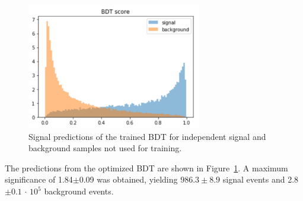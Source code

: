 \begin{figure}[!h]
\begin{center}
\includegraphics[width=3in]{BDT/bdt_pred}
\caption{Signal predictions of the trained BDT for independent signal and background samples not used for training.}
\label{fig:bdt_pred}
\end{center}
\end{figure}

The predictions from the optimized BDT are shown in Figure~\ref{fig:bdt_pred}. A maximum significance of 1.84$\pm$0.09 was obtained, yielding $986.3 \pm 8.9$ signal events and 2.8$\pm 0.1$ $\cdot$ $10^5$ background events. 
